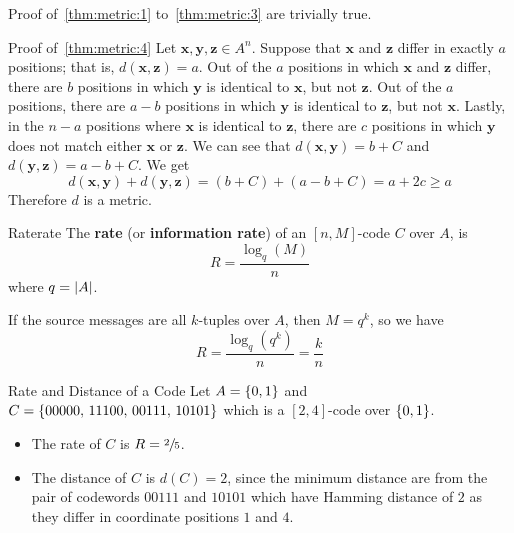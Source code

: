 \begin{Proof}{}{}

    Proof of~\ref{thm:metric:1} to~\ref{thm:metric:3} are trivially true.

    Proof of~\ref{thm:metric:4} Let $ \symbf{x},\symbf{y},\symbf{z}\in A^n $. Suppose that $ \symbf{x} $
    and $ \symbf{z} $ differ in exactly $ a $ positions; that is, $ d(\symbf{x},\symbf{z})=a $.
    Out of the $ a $ positions in which $ \symbf{x} $ and $ \symbf{z} $ differ,
    there are $ b $ positions in which $ \symbf{y} $ is identical to
    $ \symbf{x} $, but not $ \symbf{z} $. Out of the $ a $ positions,
    there are $ a-b $ positions in which $ \symbf{y} $ is identical to
    $ \symbf{z} $, but not $ \symbf{x} $. Lastly, in the $ n-a $ positions
    where $ \symbf{x} $ is identical to $ \symbf{z} $, there are $ c $
    positions in which $ \symbf{y} $ does not match either
    $ \symbf{x} $ or $ \symbf{z} $. We can see that
    $ d(\symbf{x},\symbf{y})=b+C $ and $ d(\symbf{y},\symbf{z})=a-b+C $. We get
    \[ d(\symbf{x},\symbf{y})+d(\symbf{y},\symbf{z})=(b+C) + (a-b+C)=a+2c\geqslant a \]
    Therefore $ d $ is a metric.
\end{Proof}

\begin{Definition}{Rate}{rate}
    The \textbf{rate} (or \textbf{information rate}) of an $ [n,M] $-code $ C $ over
    $ A $, is
    \[ R=\frac{\log_q(M)}{n} \]
    where $ q=\lvert A\rvert $.

    If the source messages are all $ k $-tuples over $ A $, then $ M=q^k $, so we have
    \[ R=\frac{\log_q(q^k)}{n}=\frac{k}{n}  \]
\end{Definition}

\begin{Example}{Rate and Distance of a Code}{}
    Let $ A=\{0,1\} $ and $ C=\{00000,\,11100,\,00111,\,10101\} $ which is a
    $ [2,4] $-code over $ \{0,1\} $.
    \begin{itemize}
        \item The rate of $ C $ is $ R=\sfrac{2}{5} $.
        \item The distance of $ C $ is $ d(C)=2 $, since the minimum distance
              are from the pair of codewords $ 00111 $ and $ 10101 $ which
              have Hamming distance of $ 2 $ as they differ in coordinate
              positions $ 1 $ and $ 4 $.
    \end{itemize}
\end{Example}
